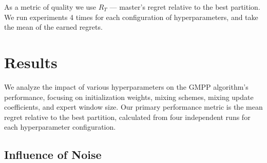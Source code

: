 \documentclass[12pt, twoside]{article}
\begin{document}
As a metric of quality we use $R_T$ --- master's regret relative to the best partition.
We run experiments 4 times for each configuration of hyperparameters, and take the mean of the earned regrets.

\section{Results}

We analyze the impact of various hyperparameters on the GMPP algorithm's performance, focusing on initialization weights, mixing schemes, mixing update coefficients, and expert window size. Our primary performance metric is the mean regret relative to the best partition, calculated from four independent runs for each hyperparameter configuration.

\subsection{Influence of Noise}
\end{document}
